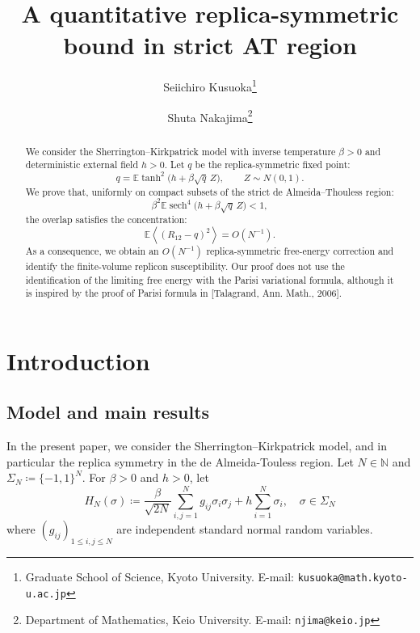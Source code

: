 \documentclass[11pt]{article}
\title{A quantitative replica-symmetric bound in strict AT region}
\author{
  Seiichiro Kusuoka\thanks{Graduate School of Science, Kyoto University. E-mail: \texttt{kusuoka@math.kyoto-u.ac.jp}}
  \and
  Shuta Nakajima\thanks{Department of Mathematics, Keio University. E-mail: \texttt{njima@keio.jp}}
}
\date{}
\numberwithin{equation}{section}
\newcommand{\E}{\mathbb{E}}
\newcommand{\1}{\mathbf 1}
\newcommand{\sech}{\operatorname{sech}}
\newcommand{\braket}[1]{\left\langle #1\right\rangle}
\begin{document}
\maketitle

\begin{abstract}
We consider the Sherrington--Kirkpatrick model with inverse temperature $\beta>0$ and deterministic external
field $h>0$.  Let $q$ be  the replica-symmetric fixed point: 
$$ q=\E\tanh^2\bigl(h+\beta\sqrt q\,Z\bigr),
 \qquad Z\sim N(0,1).$$
We prove that, uniformly on compact subsets of the strict
de Almeida--Thouless region:
$$\beta^2\E\sech^4\bigl(h+\beta\sqrt q\,Z\bigr) <1,$$ 
the overlap satisfies the concentration:
$$
 \E\braket{(R_{12}-q)^2}=O(N^{-1}).
$$
  As a consequence, we
obtain an $O(N^{-1})$ replica-symmetric free-energy correction and
identify the finite-volume replicon susceptibility.  Our proof does not use the identification of
the limiting free energy with the Parisi variational formula, although it is inspired by the proof of   Parisi formula in [Talagrand, Ann. Math., 2006].
\end{abstract}

\section{Introduction}\label{sec:intro}

\subsection{Model and main results}

In the present paper, we consider the Sherrington--Kirkpatrick model, and in particular the replica symmetry in the de Almeida-Touless region.
Let $N \in {\mathbb N}$ and $\Sigma_N\coloneqq\{-1,1\}^N$.  For $\beta>0$ and $h>0$, let
\[
 H_N(\sigma)
 \coloneqq
 \frac{\beta}{\sqrt{2N}}\sum_{i,j=1}^Ng_{ij}\sigma_i\sigma_j
 +h\sum_{i=1}^N\sigma_i , \quad \sigma \in \Sigma _N
\]
where $(g_{ij})_{1\le i,j\le N}$ are independent standard normal random variables. 
\end{document}
